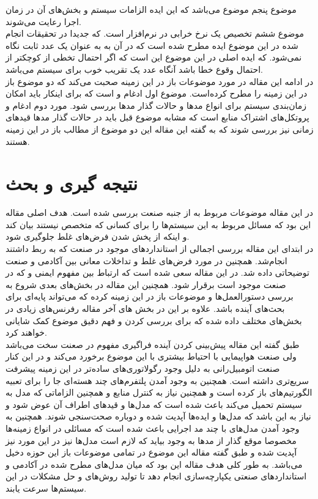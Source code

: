 \documentclass[a4paper, 12pt]{article}
\begin{document}
موضوع پنجم موضوع
می‌باشد که این ایده الزامات سیستم و بخش‌های آن در زمان اجرا رعایت می‌شوند. \\
موضوع ششم تخصیص یک نرخ خرابی در نرم‌افزار است.
که جدیدا در تحقیقات انجام شده در این موضوع ایده
مطرح شده است که در آن به
به عنوان یک عدد ثابت نگاه نمی‌شود.
که ایده اصلی در این موضوع این است که اگر احتمال تخطی از
کوچکتر از احتمال وقوع خطا باشد آنگاه عدد
یک تقریب خوب برای سیستم می‌باشد. \\
در ادامه این مقاله در مورد موضوعات باز در این زمینه صحبت می‌کند که دو موضوع باز در این زمینه
را مطرح کرده‌است.
موضوع اول ادغام
و
است که برای اینکار باید امکان زمان‌بندی سیستم برای انواع مد‌ها و حالات گذار‌ مد‌ها بررسی شود.
مورد دوم ادغام
و پروتکل‌های اشتراک منابع است که مشابه موضوع قبل باید در حالات گذار مد‌ها قید‌های زمانی نیز
بررسی شوند که به گفته این مقاله این دو موضوع از مطالب باز در این زمینه هستند.

\section{نتیجه گیری و بحث}
در این مقاله موضوعات مربوط به
از جنبه صنعت بررسی شده است. هدف اصلی مقاله این بود که مسائل مربوط به این
سیستم‌ها را برای کسانی که متخصص نیستند بیان کند و اینکه از پخش شدن
فرض‌های غلط جلوگیری شود. \\
در ابتدای‌ این مقاله بررسی اجمالی از استاندارد‌های موجود در صنعت که به
ربط داشتند انجام‌شد. همچنین در مورد فرض‌های غلط و تداخلات معانی بین آکادمی و صنعت
توضیحاتی داده شد.
در این مقاله سعی شده است که ارتباط بین مفهوم ایمنی و
که در صنعت موجود است برقرار شود.
همچنین این مقاله در بخش‌های بعدی شروع به بررسی دستورالعمل‌ها و موضوعات باز در این زمینه کرده
که می‌تواند پایه‌ای برای بحث‌های آینده باشد.
علاوه بر این در بخش های آخر مقاله رفرنس‌های زیادی در بخش‌های مختلف داده شده که برای
بررسی کردن و فهم دقیق موضوع کمک شایانی خواهند کرد. \\
طبق گفته این مقاله پیش‌بینی کردن آینده فراگیری مفهوم
در صعنت سخت می‌باشد ولی صنعت هواپیمایی با احتیاط بیشتری با این موضوع برخورد می‌کند
و در این کنار صنعت اتومبیل‌رانی به دلیل وجود رگولاتوری‌های ساده‌تر در این زمینه
پیشرفت سریع‌تری داشته است.
همچنین به وجود آمدن پلتفرم‌های چند هسته‌ای جا را برای تعبیه الگورتیم‌های
باز کرده است و همچنین نیاز به کنترل منابع و همچنین الزاماتی که مدل
به سیستم تحمیل می‌کند باعث شده است که مدل‌ها و قید‌های اطراف آن عوض شود و نیاز به این
باشد که مدل‌ها و ایده‌ها آپدیت شده و دوباره صحت‌سنجی شوند.
همچنین به وجود آمدن مدل‌های با چند مد اجرایی باعث شده است که مسائلی در انواع زمینه‌ها
مخصوصا موقع گذار از مد‌ها به وجود بیاید که لازم است مدل‌ها نیز در این مورد نیز آپدیت شده و طبق
گفته مقاله این موضوع در تمامی موضوعات باز این حوزه دخیل می‌باشد.
به طور کلی هدف مقاله این بود که میان مدل‌های مطرح شده در آکادمی و استاندارد‌های صنعتی یکپارچه‌سازی
انجام دهد تا تولید روش‌های و حل مشکلات در این سیستم‌ها سرعت یابند.


\end{document}
